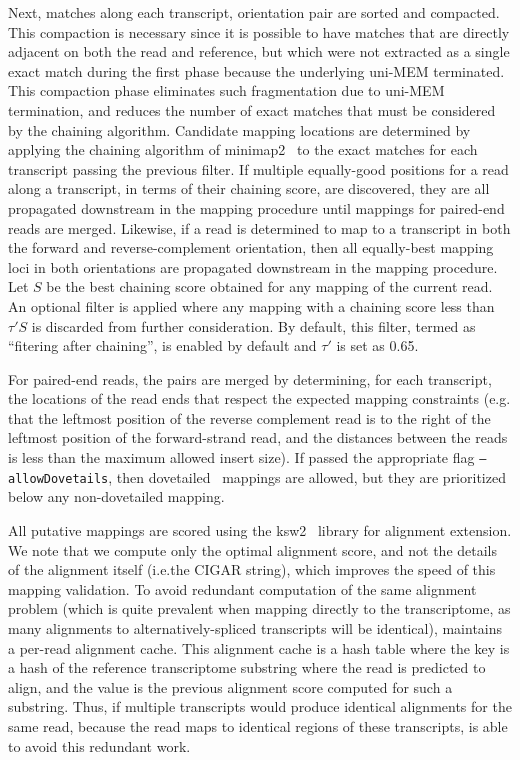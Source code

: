 Next, matches along each transcript, orientation pair are sorted and
compacted. This compaction is necessary since it is possible to have matches
that are directly adjacent on both the read and reference, but which were not
extracted as a single exact match during the first phase because the
underlying uni-MEM terminated. This compaction phase eliminates such
fragmentation due to uni-MEM termination, and reduces the number of exact
matches that must be considered by the chaining algorithm. Candidate mapping
locations are determined by applying the chaining algorithm of
minimap2~\cite{minimap2} to the exact matches for each transcript passing the
previous filter. If multiple equally-good positions for a read along a
transcript, in terms of their chaining score, are discovered, they are all
propagated downstream in the mapping procedure until mappings for paired-end
reads are merged. Likewise, if a read is determined to map to a transcript in
both the forward and reverse-complement orientation, then all equally-best
mapping loci in both orientations are propagated downstream in the mapping
procedure.  Let $S$ be the best chaining score obtained for any mapping of
the current read.  An optional filter is applied where any mapping with a 
chaining score less than $\tau' S$ is discarded from further consideration.
By default, this filter, termed as ``fitering after chaining'', is enabled 
by default and $\tau'$ is set as 0.65.

For paired-end reads, the pairs are merged by determining, for each
transcript, the locations of the read ends that respect the expected mapping
constraints (e.g. that the leftmost position of the reverse complement read
is to the right of the leftmost position of the forward-strand read, and the
distances between the reads is less than the maximum allowed insert size). If
passed the appropriate flag \texttt{--allowDovetails}, then
dovetailed~\cite{bt2manual} mappings are allowed, but they are prioritized
below any non-dovetailed mapping.


All putative mappings are scored using the ksw2~\cite{minimap2,suzuki2018introducing} library
for alignment extension. We note that we compute only the optimal alignment
score, and not the details of the alignment itself (i.e.\@ the CIGAR string),
which improves the speed of this mapping validation. To avoid redundant
computation of the same alignment problem (which is quite prevalent when mapping
directly to the transcriptome, as many alignments to alternatively-spliced
transcripts will be identical), \hsa maintains a per-read alignment cache. This
alignment cache is a hash table where the key is a hash of the reference
transcriptome substring where the read is predicted to align, and the value is
the previous alignment score computed for such a substring. Thus, if multiple
transcripts would produce identical alignments for the same read, because the
read maps to identical regions of these transcripts, \hsa is able to avoid
this redundant work.

